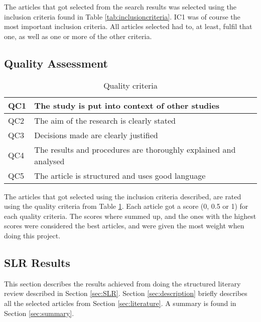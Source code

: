 The articles that got selected from the search results was selected using the inclusion criteria found in Table \ref{tab:inclusioncriteria}. IC1 was of course the most important inclusion criteria. All articles selected had to, at least, fulfil that one, as well as one or more of the other criteria.


\subsection{Quality Assessment}
\label{sec:qualityassessment}
\begin{table}[h]
\centering
\begin{tabular}{|l|l|} \hline
QC1 & The study is put into context of other studies\\ \hline
QC2 & The aim of the research is clearly stated\\ \hline
QC3 & Decisions made are clearly justified\\ \hline
QC4 & The results and procedures are thoroughly explained and analysed \\ \hline
QC5 & The article is structured and uses good language \\ \hline
\end{tabular}
\caption{Quality criteria}
\label{tab:qualitycriteria}
\end{table}

The articles that got selected using the inclusion criteria described, are rated using the quality criteria from Table \ref{tab:qualitycriteria}. Each article got a score (0, 0.5 or 1) for each quality criteria. The scores where summed up, and the ones with the highest scores were considered the best articles, and were given the most weight when doing this project.


\subsection{SLR Results}
\label{sec:slrresults}
This section describes the results achieved from doing the structured literary review described in Section \ref{sec:SLR}. Section \ref{sec:description} briefly describes all the selected articles from Section \ref{sec:literature}. A summary is found in Section \ref{sec:summary}.

